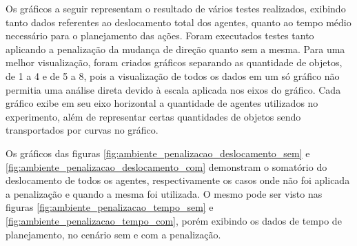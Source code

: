 Os gráficos a seguir representam o resultado de vários testes realizados, exibindo tanto dados referentes ao deslocamento total dos agentes, quanto ao tempo médio necessário para o planejamento das ações. Foram executados testes tanto aplicando a penalização da mudança de direção quanto sem a mesma. Para uma melhor visualização, foram criados gráficos separando as quantidade de objetos, de 1 a 4 e de 5 a 8, pois a visualização de todos os dados em um só gráfico não permitia uma análise direta devido à escala aplicada nos eixos do gráfico. Cada gráfico exibe em seu eixo horizontal a quantidade de agentes utilizados no experimento, além de representar certas quantidades de objetos sendo transportados por curvas no gráfico.

Os gráficos das figuras \ref{fig:ambiente_penalizacao_deslocamento_sem} e \ref{fig:ambiente_penalizacao_deslocamento_com} demonstram o somatório do deslocamento de todos os agentes, respectivamente os casos onde não foi aplicada a penalização e quando a mesma foi utilizada.
O mesmo pode ser visto nas figuras \ref{fig:ambiente_penalizacao_tempo_sem} e \ref{fig:ambiente_penalizacao_tempo_com}, porém exibindo os dados de tempo de planejamento, no cenário sem e com a penalização.


